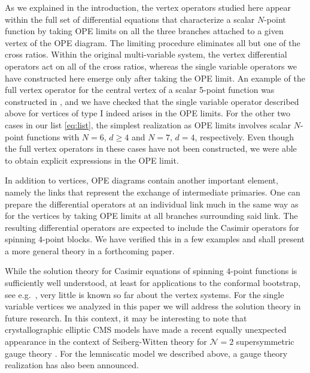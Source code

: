 \documentclass{article}
\begin{document}
As we explained in the introduction, the vertex operators studied here 
appear within the full set of differential equations that characterize a 
scalar $N$-point function by taking OPE limits on all the three branches attached to a given vertex of the OPE diagram. The limiting 
procedure eliminates all but one of the cross ratios. Within the original 
multi-variable system, the vertex differential operators act on all of the 
cross ratios, whereas the single variable operators we have constructed here 
emerge only after taking the OPE limit. An example of the full  
vertex operator for the central vertex of a scalar 5-point function was 
constructed in \cite{Buric:2021ywo}, and we have checked that the 
single variable operator described above for vertices of type I indeed arises 
in the OPE limits. For the other two cases in our list \eqref{eq:list}, 
the simplest realization as OPE limits involves scalar $N$-point 
functions with $N=6$, $d \geq 4$ and $N=7$, $d=4$, respectively. Even 
though the full vertex operators in these cases have not been constructed, 
we were able to obtain explicit expressions in the OPE limit. 

In addition to vertices, OPE diagrams contain another important element, 
namely the links that represent the exchange of intermediate primaries. 
One can prepare the differential operators at an individual link much 
in the same way as for the vertices by taking OPE limits at all branches 
surrounding said link. The resulting differential operators are expected to 
include the Casimir operators for spinning $4$-point blocks. We have verified this 
in a few examples and shall present a more general theory in a forthcoming paper. 

While the solution theory for Casimir equations of spinning $4$-point functions 
is sufficiently well understood, at least for applications to the conformal 
bootstrap, see e.g.\  \cite{Costa:2011dw,Iliesiu:2015akf,Echeverri:2016dun,Karateev:2017jgd,
Schomerus:2016epl,Schomerus:2017eny}, very little is known so far about the vertex 
systems. For the single variable vertices we analyzed in this paper we will address 
the solution theory in future research. In this context, it may be interesting to note 
that crystallographic elliptic CMS models have made a recent equally 
unexpected appearance in the context of Seiberg-Witten theory for 
$\mathcal{N}=2$ supersymmetric gauge theory \cite{Argyres:2021iws}. 
For the lemniscatic model we described above, a gauge theory 
realization has also been announced. 
\end{document}
